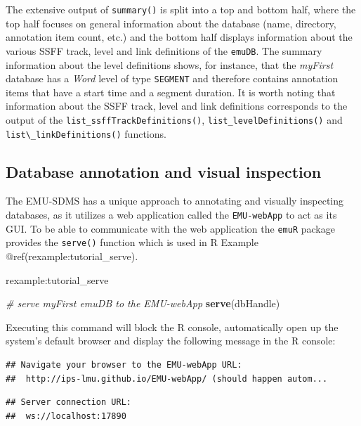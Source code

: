 \documentclass[]{book}
\newenvironment{Shaded}{\begin{snugshade}}{\end{snugshade}}
\newcommand{\CommentTok}[1]{\textcolor[rgb]{0.56,0.35,0.01}{\textit{#1}}}
\newcommand{\KeywordTok}[1]{\textcolor[rgb]{0.13,0.29,0.53}{\textbf{#1}}}
\newcommand{\NormalTok}[1]{#1}
\theoremstyle{definition}
\theoremstyle{definition}
\theoremstyle{definition}
\theoremstyle{remark}
\begin{document}
The extensive output of \texttt{summary()} is split into a top and
bottom half, where the top half focuses on general information about the
database (name, directory, annotation item count, etc.) and the bottom
half displays information about the various SSFF track, level and link
definitions of the \texttt{emuDB}. The summary information about the
level definitions shows, for instance, that the \emph{myFirst} database
has a \emph{Word} level of type \texttt{SEGMENT} and therefore contains
annotation items that have a start time and a segment duration. It is
worth noting that information about the SSFF track, level and link
definitions corresponds to the output of the
\texttt{list\_ssffTrackDefinitions()}, \texttt{list\_levelDefinitions()}
and \texttt{list\textbackslash{}\_linkDefinitions()} functions.

\hypertarget{database-annotation-and-visual-inspection}{%
\subsection{Database annotation and visual
inspection}\label{database-annotation-and-visual-inspection}}

The EMU-SDMS has a unique approach to annotating and visually inspecting
databases, as it utilizes a web application called the
\texttt{EMU-webApp} to act as its GUI. To be able to communicate with
the web application the \texttt{emuR} package provides the
\texttt{serve()} function which is used in R Example
@ref(rexample:tutorial\_serve).

rexample:tutorial\_serve

\begin{Shaded}
\begin{Highlighting}[]
\CommentTok{# serve myFirst emuDB to the EMU-webApp}
\KeywordTok{serve}\NormalTok{(dbHandle)}
\end{Highlighting}
\end{Shaded}

Executing this command will block the R console, automatically open up
the system's default browser and display the following message in the R
console:

\begin{verbatim}
## Navigate your browser to the EMU-webApp URL: 
##  http://ips-lmu.github.io/EMU-webApp/ (should happen autom...
\end{verbatim}

\begin{verbatim}
## Server connection URL: 
##  ws://localhost:17890
\end{verbatim}
\end{document}
